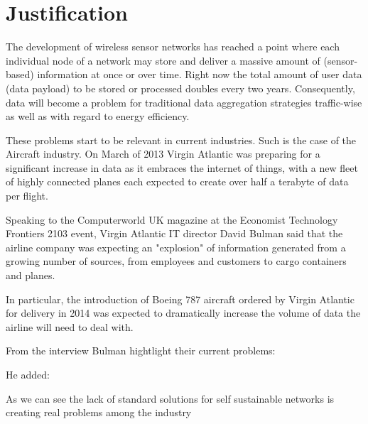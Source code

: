 \section{Justification}
\noindent

The development of wireless sensor networks has reached a point where each 
individual node of a network may store and deliver a massive amount of 
(sensor-based) information at once or over time. Right now the total amount of 
user data (data payload) to be stored or processed doubles every two years. Consequently,
data will become a problem for traditional data aggregation strategies 
traffic-wise as well as with regard to energy efficiency. 

These problems start to be relevant in current industries. Such is the case of 
the Aircraft industry. On March of 2013 Virgin Atlantic was preparing for a 
significant increase in data as it embraces the internet of things, with a new fleet of highly 
connected planes each expected to create over half a terabyte of data per flight.

Speaking to the Computerworld UK magazine at the Economist Technology Frontiers 2103 event, Virgin 
Atlantic IT director David Bulman said that the airline company was expecting an 
"explosion" of information generated from a growing number of sources, from 
employees and customers to cargo containers and planes.

In particular, the introduction of Boeing 787 aircraft ordered by Virgin 
Atlantic for delivery in 2014  was expected to dramatically increase the volume 
of data the airline will need to deal with.

From the interview Bulman hightlight their current problems: 


He added: 


As we can see the lack of standard solutions for self sustainable networks is 
creating real problems among the industry


\clearpage
